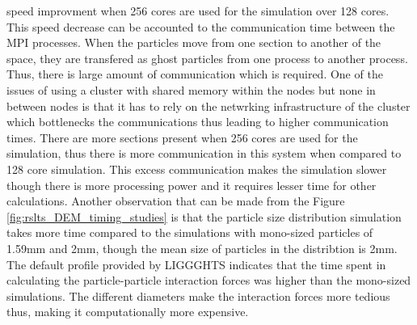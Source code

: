 \documentclass[preprint,11pt,authoryear]{elsarticle}
\begin{document}
speed improvment when 256 cores are used for the simulation over 128 cores. This speed decrease 
can be accounted to the communication time between the MPI processes. When the particles move 
from one section to another of the space, they are transfered as ghost particles from one process to 
another process. Thus, there is large amount of communication which is required. One of the issues of 
using a cluster with shared memory within the nodes but none in between nodes is that it has to rely 
on the netwrking infrastructure of the cluster which bottlenecks the communications thus leading to 
higher communication times. There are more sections present when 256 cores are used for the 
simulation, thus there is more communication in this system when compared to 128 core simulation. 
This excess communication makes the simulation slower though there is more processing power and 
it requires lesser time for other calculations. Another observation that can be made from the Figure 
\ref{fig:rslts_DEM_timing_studies} is that the particle size distribution simulation takes more time 
compared to the simulations with mono-sized particles of 1.59mm and 2mm, though the mean size of 
particles in the distribtion is 2mm. The default profile provided by LIGGGHTS indicates that the time 
spent in calculating the particle-particle interaction forces was higher than the mono-sized 
simulations. The different diameters make the interaction forces more tedious thus, making it 
computationally more expensive. 
\end{document}
